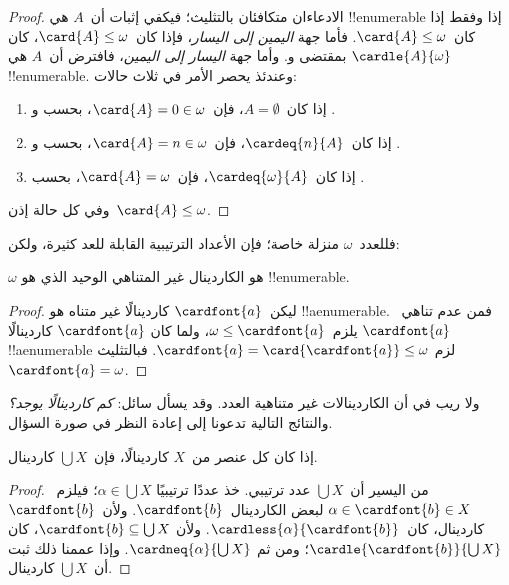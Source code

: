 \documentclass[../../../include/open-logic-section]{subfiles}
\begin{document}
\begin{proof}
الادعاءان متكافئان بالتثليث؛ فيكفي إثبات أن~$A$ هي !!{enumerable}
إذا وفقط إذا كان~$\card{A} \leq \omega$. فأما جهة
\emph{اليمين إلى اليسار}، فإذا كان~$\card{A} \leq \omega$، كان
$\cardle{A}{\omega}$ بمقتضى
و. وأما جهة \emph{اليسار إلى اليمين}،
فافترض أن~$A$ هي !!{enumerable}. وعندئذ يحصر
 الأمر في ثلاث حالات:
\begin{enumerate}
	\item إذا كان~$A = \emptyset$، فإن~$\card{A} = 0 \in \omega$، بحسب
	 و
	.
	\item إذا كان~$\cardeq{n}{A}$، فإن~$\card{A} = n \in \omega$، بحسب
	 و
	.
	\item إذا كان~$\cardeq{\omega}{A}$، فإن~$\card{A} = \omega$، بحسب
	.
\end{enumerate}
وفي كل حالة إذن~$\card{A} \leq \omega$.
\end{proof}
\noindent
فللعدد~$\omega$ منزلة خاصة؛ فإن الأعداد الترتيبية القابلة للعد كثيرة،
ولكن:

\begin{cor}
$\omega$ هو الكاردينال غير المتناهي الوحيد الذي هو !!{enumerable}.
\end{cor}

\begin{proof}
ليكن~$\cardfont{a}$ كاردينالًا غير متناه هو !!a{enumerable}. فمن عدم
تناهي~$\cardfont{a}$ يلزم~$\omega \leq \cardfont{a}$، ولما كان
$\cardfont{a}$ كاردينالًا !!a{enumerable} لزم
$\cardfont{a} = \card{\cardfont{a}} \leq \omega$. فبالتثليث
$\cardfont{a} = \omega$.
\end{proof}

ولا ريب في أن الكاردينالات غير متناهية العدد. وقد يسأل سائل:
\emph{كم كاردينالًا يوجد؟} والنتائج التالية تدعونا إلى إعادة النظر
في صورة السؤال.

\begin{prop}
إذا كان كل عنصر من~$X$ كاردينالًا، فإن~$\bigcup X$ كاردينال.
\end{prop}

\begin{proof}
من اليسير أن~$\bigcup X$ عدد ترتيبي. خذ عددًا ترتيبيًا
$\alpha \in \bigcup X$؛ فيلزم~$\alpha \in \cardfont{b} \in X$
لبعض الكاردينال~$\cardfont{b}$. ولأن~$\cardfont{b}$ كاردينال،
كان~$\cardless{\alpha}{\cardfont{b}}$. ولأن
$\cardfont{b} \subseteq \bigcup X$، كان
$\cardle{\cardfont{b}}{\bigcup X}$؛ ومن ثم
$\cardneq{\alpha}{\bigcup X}$. وإذا عممنا ذلك ثبت أن~$\bigcup X$
كاردينال.
\end{proof}
\end{document}

